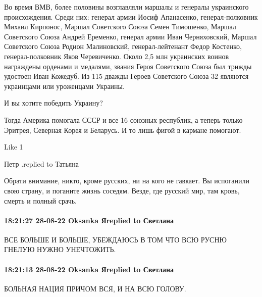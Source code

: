 Во время ВМВ, более половины возглавляли маршалы и генералы украинского
происхождения. Среди них: генерал армии Иосиф Апанасенко, генерал-полковник
Михаил Кирпонос, Маршал Советского Союза Семен Тимошенко, Маршал Советского
Союза Андрей Еременко, генерал армии Иван Черняховский, Маршал Советского Союза
Родион Малиновский, генерал-лейтенант Федор Костенко, генерал-полковник Яков
Черевиченко. Около 2,5 млн украинских воинов награждены орденами и медалями,
звания Героя Советского Союза был трижды удостоен Иван Кожедуб. Из 115 дважды
Героев Советского Союза 32 являются украинцами или уроженцами Украины.

И вы хотите победить Украину?

Тогда Америка помогала СССР и все 16 союзных республик, а теперь только
Эритрея, Северная Корея и Беларусь. И то лишь фигой в кармане помогают.

    Like 1

Петр .replied to Татьяна

Обрати внимание, никто, кроме  русских, ни на кого не гавкает. Вы испоганили
свою страну, и поганите жизнь соседям. Везде, где русский мир, там кровь,
смерть и полный срачь.

\paragraph{18:21:27 28-08-22 Oksanka Яreplied to Светлана}
ВСЕ БОЛЬШЕ И БОЛЬШЕ, УБЕЖДАЮСЬ В ТОМ ЧТО ВСЮ РУСНЮ ГНЕЛУЮ НУЖНО УНЕЧТОЖИТЬ.

\paragraph{18:21:13 28-08-22 Oksanka Яreplied to Светлана}

БОЛЬНАЯ НАЦИЯ ПРИЧОМ ВСЯ, И НА ВСЮ ГОЛОВУ.🤣🤣🤣🤣🤣🤣🤣

